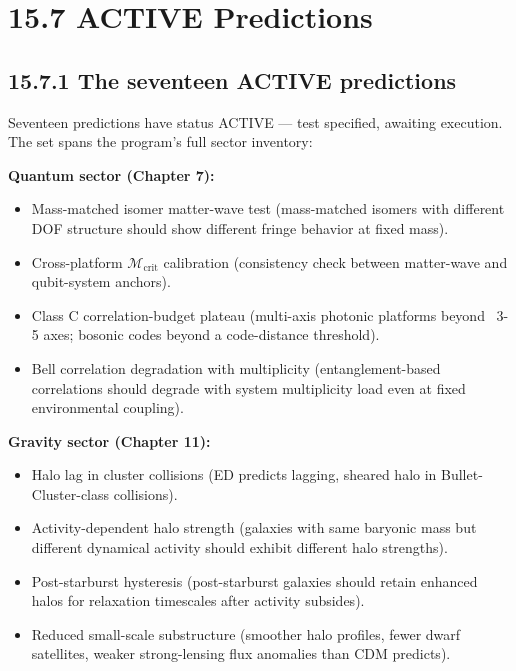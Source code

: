 \documentclass[11pt]{book}
\begin{document}
\section{15.7 ACTIVE Predictions}

\subsection{15.7.1 The seventeen ACTIVE predictions}

Seventeen predictions have status ACTIVE — test specified, awaiting execution. The set spans the program's full sector inventory:

\textbf{Quantum sector (Chapter 7):}
\begin{itemize}
\item Mass-matched isomer matter-wave test (mass-matched isomers with different DOF structure should show different fringe behavior at fixed mass).
\item Cross-platform $\mathcal{M}_\mathrm{crit}$ calibration (consistency check between matter-wave and qubit-system anchors).
\item Class C correlation-budget plateau (multi-axis photonic platforms beyond ~3-5 axes; bosonic codes beyond a code-distance threshold).
\item Bell correlation degradation with multiplicity (entanglement-based correlations should degrade with system multiplicity load even at fixed environmental coupling).
\end{itemize}

\textbf{Gravity sector (Chapter 11):}
\begin{itemize}
\item Halo lag in cluster collisions (ED predicts lagging, sheared halo in Bullet-Cluster-class collisions).
\item Activity-dependent halo strength (galaxies with same baryonic mass but different dynamical activity should exhibit different halo strengths).
\item Post-starburst hysteresis (post-starburst galaxies should retain enhanced halos for relaxation timescales after activity subsides).
\item Reduced small-scale substructure (smoother halo profiles, fewer dwarf satellites, weaker strong-lensing flux anomalies than CDM predicts).
\end{itemize}
\end{document}
